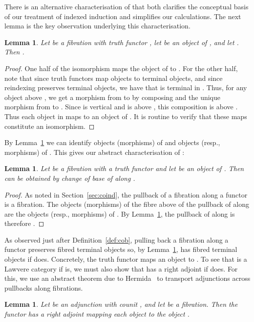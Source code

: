 \documentclass{LMCS}
\theoremstyle{plain}
\newtheorem{lemma}[theorem]{Lemma}
\theoremstyle{remark}
\theoremstyle{definition}
\begin{document}
There is an alternative characterisation of  that both
clarifies the conceptual basis of our treatment of indexed induction
and simplifies our calculations. The next lemma is the key observation
underlying this characterisation.
\begin{lemma}\label{lem:simindex}
  Let  be a fibration with truth functor , let 
  be an object of , and let . Then
  .
\end{lemma}
\begin{proof}
  One half of the isomorphism maps the object  of
   to . For the other half, note that since truth
  functors map objects to terminal objects, and since reindexing
  preserves terminal objects, we have that  is terminal
  in . Thus, for any object  above , we get a morphism
  from  to  by composing  and the unique
  morphism  from  to . Since  is vertical and
   is above , this composition is above
  . Thus each object  in  maps to an object of
  . It is routine to verify that these maps
  constitute an isomorphism.
\end{proof}
By Lemma~\ref{lem:simindex} we can identify objects (morphisms) of
 and objects (resp., morphisms) of .  This
gives our abstract characterisation of :
\begin{lemma}\label{lem:U/Icob}
  Let  be a fibration with a truth functor and let 
  be an object of .  Then  can be obtained by change of base
  of  along .
\end{lemma}
\begin{proof}
  As noted in Section~\ref{sec:coind}, the pullback of a fibration
  along a functor is a fibration. The objects (morphisms) of the fibre
  above  of the pullback of  along 
  are the objects (resp., morphisms) of . By
  Lemma~\ref{lem:simindex}, the pullback of  along 
  is therefore .
\end{proof}

As observed just after Definition~\ref{def:cob}, pulling back a
fibration along a functor preserves fibred terminal objects so, by
Lemma~\ref{lem:U/Icob},  has fibred terminal objects if 
does. Concretely, the truth functor  maps an
object  to . To see that  is a Lawvere
category if  is, we must also show that  has a right
adjoint if  does. For this, we use an abstract theorem due to
Hermida~\cite{her93} to transport adjunctions across pullbacks along
fibrations.

\begin{lemma}\label{lem:claudio}
  Let  be an adjunction with counit ,
  and let  be a fibration. Then the functor  has a right adjoint  mapping each object
   to the object .
\end{lemma}
\end{document}
